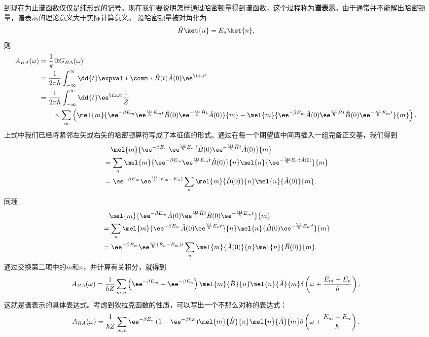 到现在为止谱函数仅仅是纯形式的记号。现在我们要说明怎样通过哈密顿量得到谱函数，这个过程称为\textbf{谱表示}。由于通常并不能解出哈密顿量，谱表示的理论意义大于实际计算意义。
设哈密顿量被对角化为
\[
    \hat{H} \ket{n} = E_n \ket{n},
\]
则
\[
    \begin{aligned}
        A_{BA} (\omega) &= \frac{1}{\pi} \Im G_{BA}(\omega) \\
        &= \frac{1}{2 \pi \hbar} \int_{-\infty}^\infty \dd{t} \expval*{\comm*{\hat{B}(t)}{\hat{A}(0)}} \ee^{\ii \omega t} \\
        &= \frac{1}{2 \pi \hbar} \int_{-\infty}^\infty \dd{t} \ee^{\ii \omega t} \frac{1}{Z} \\
        & \quad \quad \times \sum_m \left( \mel{m}{\ee^{-\beta E_m} \ee^{\frac{\ii}{\hbar} E_m t} \hat{B}(0) \ee^{- \frac{\ii}{\hbar} \hat{H} t} \hat{A}(0) }{m} - \mel{m}{\ee^{-\beta E_m} \hat{A}(0) \ee^{\frac{\ii}{\hbar} \hat{H} t} \hat{B}(0) \ee^{- \frac{\ii}{\hbar} E_m t} }{m} \right).
    \end{aligned}
\]
上式中我们已经将紧邻左矢或右矢的哈密顿算符写成了本征值的形式。通过在每一个期望值中间再插入一组完备正交基，我们得到
\[
    \begin{aligned}
        &\quad \mel{m}{\ee^{-\beta E_m} \ee^{\frac{\ii}{\hbar} E_m t} \hat{B}(0) \ee^{- \frac{\ii}{\hbar} \hat{H} t} \hat{A}(0) }{m} \\
        &= \sum_n \mel{m}{\ee^{-\beta E_m} \ee^{\frac{\ii}{\hbar} E_m t} \hat{B}(0)}{n} \mel{n}{\ee^{- \frac{\ii}{\hbar} E_n t \hat{A}(0) }}{m} \\
        &= \ee^{- \beta E_m} \ee^{\frac{\ii}{\hbar} (E_m - E_n)} \sum_n \mel{m}{\hat{B}(0)}{n} \mel{n}{\hat{A}(0)}{m},
    \end{aligned}
\]
同理
\[
    \begin{aligned}
        &\quad \mel{m}{\ee^{-\beta E_m} \hat{A}(0) \ee^{\frac{\ii}{\hbar} \hat{H} t} \hat{B}(0) \ee^{- \frac{\ii}{\hbar} E_m t} }{m} \\
        &= \sum_n \mel{m}{\ee^{-\beta E_m} \hat{A}(0) \ee^{\frac{\ii}{\hbar} E_n t}}{n} \mel{n}{\hat{B}(0) \ee^{- \frac{\ii}{\hbar} E_m t}}{m} \\
        &= \ee^{-\beta E_m} \ee^{\frac{\ii}{\hbar} (E_n - E_m) t} \sum_n \mel{m}{\hat{A}(0)}{n} \mel{n}{\hat{B}(0)}{m}.
    \end{aligned}
\]
通过交换第二项中的$m$和$n$，并计算有关积分，就得到
\begin{equation}
    A_{BA}(\omega) = \frac{1}{\hbar Z} \sum_{m,n} \left( \ee^{-\beta E_m} - \ee^{-\beta E_n} \right) \mel{m}{\hat{B}}{n} \mel{n}{\hat{A}}{m} \delta\left( \omega + \frac{E_m - E_n}{\hbar} \right).
\end{equation}
这就是谱表示的具体表达式。考虑到狄拉克函数的性质，可以写出一个不那么对称的表达式：
\begin{equation}
    A_{BA}(\omega) = \frac{1}{\hbar Z} \sum_{m,n} \ee^{-\beta E_m} (1 - \ee^{- \beta \hbar \omega}) \mel{m}{\hat{B}}{n} \mel{n}{\hat{A}}{m} \delta\left( \omega + \frac{E_m - E_n}{\hbar} \right). 
\end{equation}

